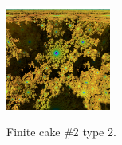 \documentclass[suppldata, dvipdfmx]{interact}
\theoremstyle{plain}%
\theoremstyle{definition}
\theoremstyle{remark}
\theoremstyle{problemstyle}
\begin{document}
\begin{figure}[h!tbp]
\begin{minipage}{0.5\textwidth}
\begin{minipage}[t]{0.24\textwidth}
  \end{minipage}
  \hspace*{\fill}
  \begin{minipage}[t]{0.24\textwidth}
   \centering
   \includegraphics[width=1.35in, height=1.35in,
   keepaspectratio]{./img/sphairahedron/hexahedralCake2/limitsetInf_b.jpg} 
   \label{fig:cake2Type2InfLimitset}
  \end{minipage}
  \hspace*{\fill}
  \caption{Finite cake \#2 type 2.}
  \label{fig:cake2Type2infinite}
 \end{minipage}
\end{figure}
\end{document}
